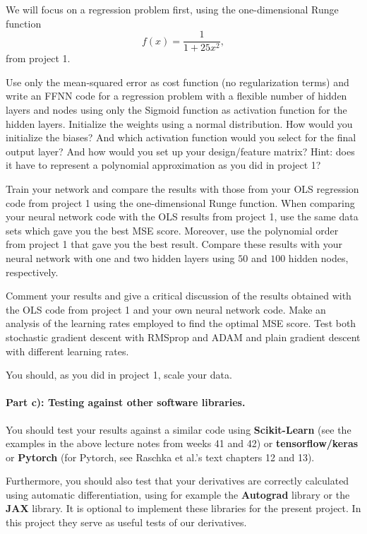 \documentclass[%
oneside,                 %
final,                   %
10pt]{article}
\begin{document}
We will focus on a regression problem first, using the one-dimensional Runge function
\[
f(x) = \frac{1}{1+25x^2},
\]
from project 1.

Use only the mean-squared error as cost function (no regularization terms) and 
write an FFNN code for a regression problem with a flexible number of hidden
layers and nodes using only the Sigmoid function as activation function for
the hidden layers. Initialize the weights using a normal
distribution. How would you initialize the biases? And which
activation function would you select for the final output layer?
And how would you set up your design/feature matrix? Hint: does it have to represent a polynomial approximation as you did in project 1? 

Train your network and compare the results with those from your OLS
regression code from project 1 using the one-dimensional Runge
function.  When comparing your neural network code with the OLS
results from project 1, use the same data sets which gave you the best
MSE score. Moreover, use the polynomial order from project 1 that gave you the
best result.  Compare these results with your neural network with one
and two hidden layers using $50$ and $100$ hidden nodes, respectively.

Comment your results and give a critical discussion of the results
obtained with the OLS code from project 1 and your own neural network
code.  Make an analysis of the learning rates employed to find the
optimal MSE score. Test both stochastic gradient descent
with RMSprop and ADAM and plain gradient descent with different
learning rates.

You should, as you did in project 1, scale your data.

\paragraph{Part c): Testing against other software libraries.}
You should test your results against a similar code using \textbf{Scikit-Learn} (see the examples in the above lecture notes from weeks 41 and 42) or \textbf{tensorflow/keras} or \textbf{Pytorch} (for Pytorch, see Raschka et al.'s text chapters 12 and 13). 

Furthermore, you should also test that your derivatives are correctly
calculated using automatic differentiation, using for example the
\textbf{Autograd} library or the \textbf{JAX} library. It is optional to implement
these libraries for the present project. In this project they serve as
useful tests of our derivatives.
\end{document}
